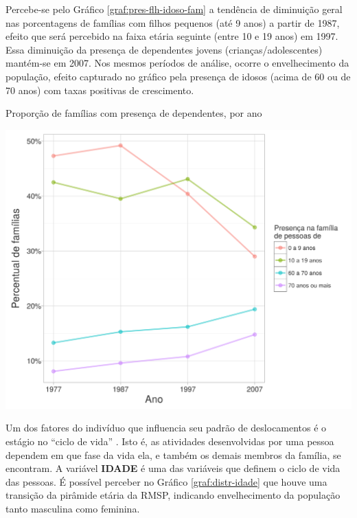 \newpage
Percebe-se pelo Gráfico \ref{graf:pres-flh-idoso-fam} a tendência de diminuição geral nas porcentagens de famílias com filhos pequenos (até 9 anos) a partir de 1987, efeito que será percebido na faixa etária seguinte (entre 10 e 19 anos) em 1997. Essa diminuição da presença de dependentes jovens (crianças/adolescentes) mantém-se em 2007. Nos mesmos períodos de análise, ocorre o envelhecimento da população, efeito capturado no gráfico pela presença de idosos (acima de 60 ou de 70 anos) com taxas positivas de crescimento.

\begin{grafico}[htb]%
    \caption{\label{graf:pres-flh-idoso-fam}Proporção de famílias com presença de dependentes, por ano}%
    \begin{center}%
        \includegraphics[width=1\textwidth]{./imagens/pres-flh-idoso-fam.png}%
    \end{center}%
\end{grafico}%

Um dos fatores do indivíduo que influencia seu padrão de deslocamentos é o estágio no ``ciclo de vida'' \cite{BILT1997}.
Isto é, as atividades desenvolvidas por uma pessoa dependem em que fase da vida ela, e também os demais membros da família, se encontram. A variável \textbf{IDADE} é uma das variáveis que definem o ciclo de vida das pessoas. É possível perceber no Gráfico \ref{graf:distr-idade} que houve uma transição da pirâmide etária da RMSP, indicando envelhecimento da população tanto masculina como feminina.

